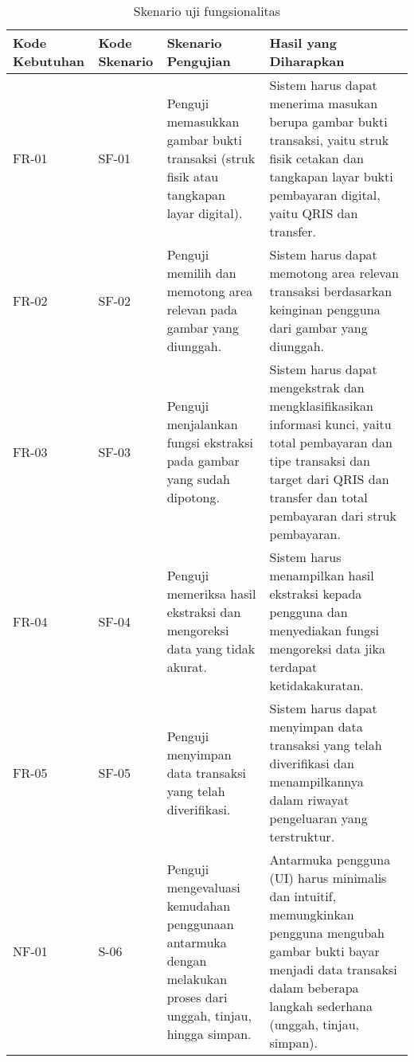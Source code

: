\begin{table}[h!]
\caption{Skenario uji fungsionalitas}
\label{tab:skenario-uji-fungsional}
\begin{tabularx}{\linewidth}{|p{1.5cm}|p{1.5cm}|p{4cm}|X|}
\hline
\textbf{Kode Kebutuhan} & \textbf{Kode Skenario} & \textbf{Skenario Pengujian} & \textbf{Hasil yang Diharapkan} \\
\hline
FR-01 & SF-01 & Penguji memasukkan gambar bukti transaksi (struk fisik atau tangkapan layar digital). & Sistem harus dapat menerima masukan berupa gambar bukti transaksi, yaitu struk fisik cetakan dan tangkapan layar bukti pembayaran digital, yaitu QRIS dan transfer. \\
\hline
FR-02 & SF-02 & Penguji memilih dan memotong area relevan pada gambar yang diunggah. & Sistem harus dapat memotong area relevan transaksi berdasarkan keinginan pengguna dari gambar yang diunggah. \\
\hline
FR-03 & SF-03 & Penguji menjalankan fungsi ekstraksi pada gambar yang sudah dipotong. & Sistem harus dapat mengekstrak dan mengklasifikasikan informasi kunci, yaitu total pembayaran dan tipe transaksi dan target dari QRIS dan transfer dan total pembayaran dari struk pembayaran. \\
\hline
FR-04 & SF-04 & Penguji memeriksa hasil ekstraksi dan mengoreksi data yang tidak akurat. & Sistem harus menampilkan hasil ekstraksi kepada pengguna dan menyediakan fungsi mengoreksi data jika terdapat ketidakakuratan. \\
\hline
FR-05 & SF-05 & Penguji menyimpan data transaksi yang telah diverifikasi. & Sistem harus dapat menyimpan data transaksi yang telah diverifikasi dan menampilkannya dalam riwayat pengeluaran yang terstruktur. \\
\hline
NF-01 & S-06 & Penguji mengevaluasi kemudahan penggunaan antarmuka dengan melakukan proses dari unggah, tinjau, hingga simpan. & Antarmuka pengguna (UI) harus minimalis dan intuitif, memungkinkan pengguna mengubah gambar bukti bayar menjadi data transaksi dalam beberapa langkah sederhana (unggah, tinjau, simpan). \\
\hline
\end{tabularx}
\end{table}


